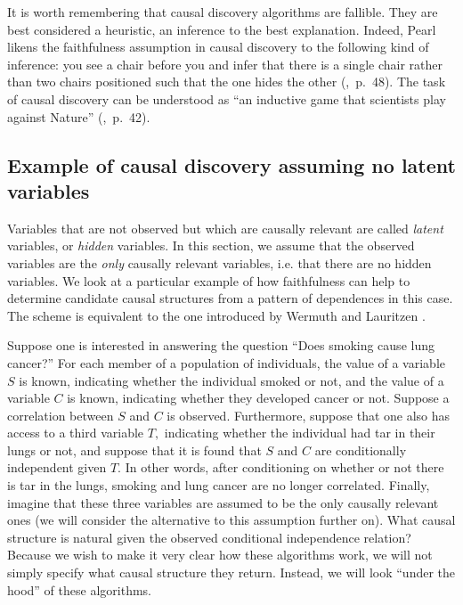 \documentclass[12pt,onecolumn,nofootinbib]{revtex4-2}
\begin{document}
It is worth remembering that causal discovery algorithms are fallible.
They are best considered a heuristic, an inference to the best explanation.
Indeed, Pearl likens the faithfulness assumption in causal discovery to the
following kind of inference: you see a chair before you and infer that there
is a single chair rather than two chairs positioned such that the one hides
the other (\cite{Pearl2009},~p.~48).  The task of causal discovery can be understood
as ``an inductive game that scientists play against Nature'' (\cite{Pearl2009},~p.~42).

\subsection{Example of causal discovery assuming no latent variables}
\label{sec:causal-nohvar}

Variables that are not observed but which are causally relevant are called \emph{latent} variables, or \emph{hidden} variables. In this section, we assume
that the observed variables are the \emph{only} causally relevant
variables, i.e. that there are no hidden
variables.  We look at a particular example of how faithfulness can help to determine
candidate causal structures from a pattern of dependences in this case.  The scheme is equivalent to the one introduced by Wermuth and Lauritzen \cite{Wermuth1983}.

Suppose one is interested in answering the question ``Does smoking cause lung cancer?''
 For each member of a population of individuals, the value of a
variable $S$ is known, indicating whether the individual smoked or not, and the value
of a variable $C$ is known, indicating whether they developed cancer or not.
Suppose a correlation between $S$ and $C$ is observed. Furthermore, suppose
that one also has access to a third variable $T,$ indicating whether the individual
had tar in their lungs or not, and suppose that it is found that $S$ and $C$ are conditionally
independent given $T.$ In other words, after conditioning on whether or
not there is tar in the lungs, smoking and lung cancer are no longer
correlated. Finally, imagine that these three variables are assumed to be
the only causally relevant ones (we will consider the alternative to this
assumption further on). What causal structure is natural given the observed
conditional independence relation?
Because we wish to make it very clear how these algorithms work, we will not
simply specify what causal structure they return. Instead, we will look
``under the hood'' of these algorithms.
\end{document}
